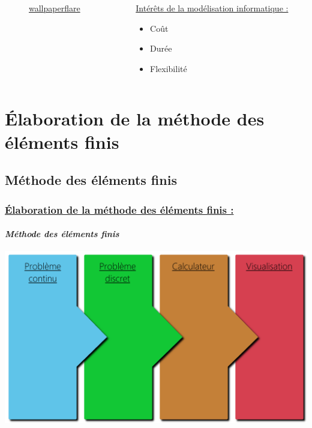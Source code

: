 \documentclass[10pt]{beamer}
\begin{document}
\begin{frame}
\begin{columns}[t]
\begin{column}{5cm}
\begin{figure}
   					\caption{\href{https://www.wallpaperflare.com/black-cables-connection-data-electronics-equipment-ethernet-wallpaper-aryet}{wallpaperflare}}
				\end{figure}
  			\end{column}
 			\begin{column}{5cm}
 				\begin{block}{}
 					\uline{Int\'er\^ets de la mod\'elisation informatique :}
					\begin{itemize}
						\item Co\^ut
						\item Dur\'ee
						\item Flexibilit\'e
					\end{itemize}
				\end{block}
			 \end{column}
 		\end{columns}
	\end{frame}
	
	\section{\'Elaboration de la m\'ethode des \'el\'ements finis}
	\subsection{M\'ethode des \'el\'ements finis}
	\begin{frame}
		\frametitle{\uline{\'Elaboration de la m\'ethode des \'el\'ements finis :}}
		\framesubtitle{\textit{M\'ethode des \'el\'ements finis}}
		\centering
		\includegraphics[scale=4.5]{Images/MethodeDesElementsFinis.png}
	\end{frame}
\end{document}
